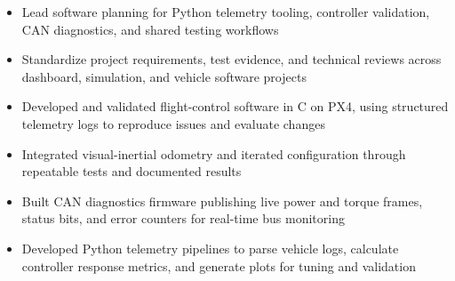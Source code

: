\documentclass[10pt,letterpaper]{article}
\begin{document}
\bodyfont

\resumeheader
\educationsection




\orgline{\spartanracing}
\begin{itemize}
  \item Lead software planning for Python telemetry tooling, controller validation, CAN diagnostics, and shared testing workflows
  \item Standardize project requirements, test evidence, and technical reviews across dashboard, simulation, and vehicle software projects
\end{itemize}

\entryspace

\begin{itemize}
  \item Developed and validated flight-control software in C on PX4, using structured telemetry logs to reproduce issues and evaluate changes
  \item Integrated visual-inertial odometry and iterated configuration through repeatable tests and documented results
\end{itemize}

\entryspace

\orgline{\spartanracing}
\begin{itemize}
  \item Built CAN diagnostics firmware publishing live power and torque frames, status bits, and error counters for real-time bus monitoring
  \item Developed Python telemetry pipelines to parse vehicle logs, calculate controller response metrics, and generate plots for tuning and validation
\end{itemize}
\end{document}
